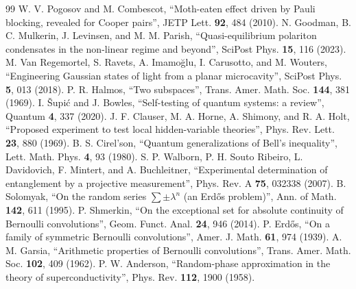 \documentclass[11pt,a4paper]{article}
\begin{document}
\begin{thebibliography}{99}
 W. V. Pogosov and M. Combescot, ``Moth-eaten effect driven by Pauli blocking, revealed for Cooper pairs'', JETP Lett. \textbf{92}, 484 (2010).
 N. Goodman, B. C. Mulkerin, J. Levinsen, and M. M. Parish, ``Quasi-equilibrium polariton condensates in the non-linear regime and beyond'', SciPost Phys. \textbf{15}, 116 (2023).
 M. Van Regemortel, S. Ravets, A. Imamo\u{g}lu, I. Carusotto, and M. Wouters, ``Engineering Gaussian states of light from a planar microcavity'', SciPost Phys. \textbf{5}, 013 (2018).
 P. R. Halmos, ``Two subspaces'', Trans. Amer. Math. Soc. \textbf{144}, 381 (1969).
 I. \v{S}upi\'c and J. Bowles, ``Self-testing of quantum systems: a review'', Quantum \textbf{4}, 337 (2020).
 J. F. Clauser, M. A. Horne, A. Shimony, and R. A. Holt, ``Proposed experiment to test local hidden-variable theories'', Phys. Rev. Lett. \textbf{23}, 880 (1969).
 B. S. Cirel'son, ``Quantum generalizations of Bell's inequality'', Lett. Math. Phys. \textbf{4}, 93 (1980).
 S. P. Walborn, P. H. Souto Ribeiro, L. Davidovich, F. Mintert, and A. Buchleitner, ``Experimental determination of entanglement by a projective measurement'', Phys. Rev. A \textbf{75}, 032338 (2007).
 B. Solomyak, ``On the random series $\sum\pm\lambda^n$ (an Erd\H{o}s problem)'', Ann. of Math. \textbf{142}, 611 (1995).
 P. Shmerkin, ``On the exceptional set for absolute continuity of Bernoulli convolutions'', Geom. Funct. Anal. \textbf{24}, 946 (2014).
 P. Erd\H{o}s, ``On a family of symmetric Bernoulli convolutions'', Amer. J. Math. \textbf{61}, 974 (1939).
 A. M. Garsia, ``Arithmetic properties of Bernoulli convolutions'', Trans. Amer. Math. Soc. \textbf{102}, 409 (1962).
 P. W. Anderson, ``Random-phase approximation in the theory of superconductivity'', Phys. Rev. \textbf{112}, 1900 (1958).
\end{thebibliography}
\end{document}
